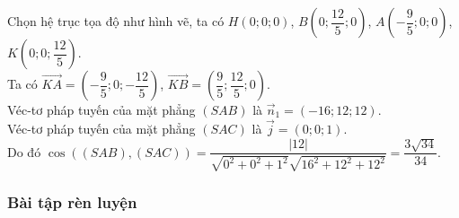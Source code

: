 \begin{vd}
{{		}
		\noindent Chọn hệ trục tọa độ như hình vẽ, ta có $ H(0;0;0) $, $ B\left( 0;\dfrac{12}{5};0\right)  $, $ A\left( -\dfrac{9}{5};0;0 \right)  $, $ K\left( 0;0;\dfrac{12}{5} \right)  $.\\Ta có
		$ \vec{KA}=\left( -\dfrac{9}{5};0;-\dfrac{12}{5} \right)  $, $ \vec{KB}=\left( \dfrac{9}{5};\dfrac{12}{5};0 \right)  $.\\
		Véc-tơ pháp tuyến của mặt phẳng $ (SAB) $ là $ \vec{n}_1=\left( -16;12;12 \right) $.\\
		Véc-tơ pháp tuyến của mặt phẳng $ (SAC) $ là $ \vec{j}=(0;0;1) $.\\
		Do đó $ \cos((SAB),(SAC))=\dfrac{|12|}{\sqrt{0^2+0^2+1^2}\sqrt{16^2+12^2+12^2}}=\dfrac{3\sqrt{34}}{34}. $
	}
\end{vd}
\subsubsection{Bài tập rèn luyện}
